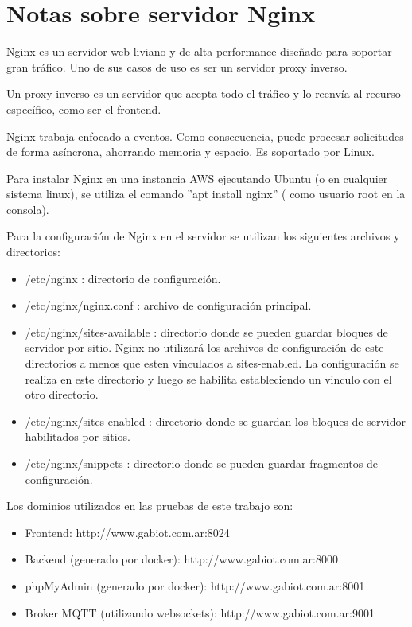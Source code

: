 
\chapter{Notas sobre servidor Nginx} %

\label{AppendixB} %

Nginx \citep{WEBSITE:36} es un servidor web liviano y de alta performance diseñado para soportar gran tráfico. Uno de sus casos de uso es ser un servidor proxy inverso.

Un proxy inverso es un servidor que acepta todo el tráfico y lo reenvía al recurso específico, como ser el frontend.

Nginx trabaja enfocado a eventos. Como consecuencia, puede procesar solicitudes de forma asíncrona, ahorrando memoria y espacio. Es soportado por Linux.

Para instalar Nginx en una instancia AWS ejecutando Ubuntu (o en cualquier sistema linux), se utiliza el comando ''apt install nginx'' ( como usuario root en la consola).

Para la configuración de Nginx en el servidor se utilizan los siguientes archivos y directorios:
\begin{itemize}
\item /etc/nginx : directorio de configuración.
\item /etc/nginx/nginx.conf : archivo de configuración principal.
\item /etc/nginx/sites-available : directorio donde se pueden guardar bloques de servidor por sitio. Nginx no utilizará los archivos de configuración de este directorios a menos que esten vinculados a sites-enabled. La configuración se realiza en este directorio y luego se habilita estableciendo un vinculo con el otro directorio.
\item /etc/nginx/sites-enabled : directorio donde se guardan los bloques de servidor habilitados por sitios. 
\item /etc/nginx/snippets : directorio donde se pueden guardar fragmentos de configuración.
\end{itemize}

Los dominios utilizados en las pruebas de este trabajo son:

\begin{itemize}
\item Frontend: http://www.gabiot.com.ar:8024
\item Backend (generado por docker): http://www.gabiot.com.ar:8000
\item phpMyAdmin (generado por docker): http://www.gabiot.com.ar:8001
\item Broker MQTT (utilizando websockets): http://www.gabiot.com.ar:9001
\end{itemize}

